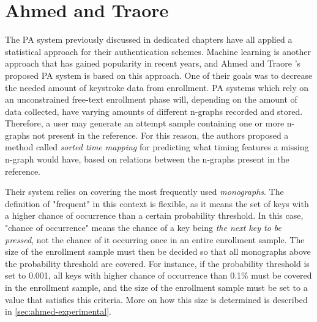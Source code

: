 \documentclass[informationsecurity]{gucmasterproject}
\begin{document}
\chapter{Ahmed and Traore}
\label{chap:ahmed}

The PA system previously discussed in dedicated chapters have all applied a statistical approach for their authentication schemes.
Machine learning is another approach that has gained popularity in recent years, and Ahmed and Traore \cite{Ahmed}'s proposed PA system is based on this approach.
One of their goals was to decrease the needed amount of keystroke data from enrollment.
PA systems which rely on an unconstrained free-text enrollment phase will, depending on the amount of data collected, have varying amounts of different n-graphs recorded and stored.
Therefore, a user may generate an attempt sample containing one or more n-graphs not present in the reference.
For this reason, the authors proposed a method called \textit{sorted time mapping} for predicting what timing features a missing n-graph would have, based on relations between the n-graphs present in the reference.

Their system relies on covering the most frequently used \textit{monographs}.
The definition of "frequent" in this context is flexible, as it means the set of keys with a higher chance of occurrence than a certain probability threshold.
In this case, "chance of occurrence" means the chance of a key being \textit{the next key to be pressed}, not the chance of it occurring once in an entire enrollment sample.
The size of the enrollment sample must then be decided so that all monographs above the probability threshold are covered.
For instance, if the probability threshold is set to 0.001, all keys with higher chance of occurrence than 0.1\% must be covered in the enrollment sample, and the size of the enrollment sample must be set to a value that satisfies this criteria.
More on how this size is determined is described in \cref{sec:ahmed-experimental}.
\end{document}
